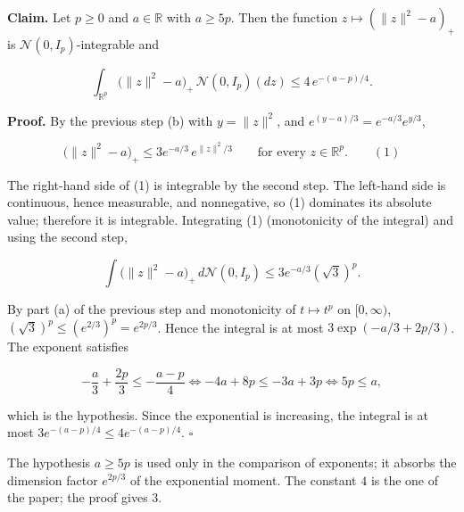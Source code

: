 \documentclass[11pt,a4paper]{article}
\begin{document}
\textbf{Claim.} Let \(p\ge0\) and \(a\in\mathbb R\) with \(a\ge5p\). Then the function \(z\mapsto(\|z\|^2-a)_+\) is \(\mathcal N(0,I_p)\)-integrable and


\[\int_{\mathbb R^p}\bigl(\|z\|^2-a\bigr)_+\,\mathcal N(0,I_p)(dz)\le4\,e^{-(a-p)/4}.\]


\textbf{Proof.} By the previous step (b) with \(y=\|z\|^2\), and \(e^{(y-a)/3}=e^{-a/3}e^{y/3}\),


\[\bigl(\|z\|^2-a\bigr)_+\le3e^{-a/3}\,e^{\|z\|^2/3}\qquad\text{for every }z\in\mathbb R^p.\qquad(1)\]


The right-hand side of (1) is integrable by the second step. The left-hand side is continuous, hence measurable, and nonnegative, so (1) dominates its absolute value; therefore it is integrable. Integrating (1) (monotonicity of the integral) and using the second step,


\[\int\bigl(\|z\|^2-a\bigr)_+\,d\mathcal N(0,I_p)\le3e^{-a/3}(\sqrt3)^p.\]


By part (a) of the previous step and monotonicity of \(t\mapsto t^p\) on \([0,\infty)\), \((\sqrt3)^p\le(e^{2/3})^p=e^{2p/3}\). Hence the integral is at most \(3\exp(-a/3+2p/3)\). The exponent satisfies


\[-\frac a3+\frac{2p}{3}\le-\frac{a-p}{4}\iff-4a+8p\le-3a+3p\iff5p\le a,\]


which is the hypothesis. Since the exponential is increasing, the integral is at most \(3e^{-(a-p)/4}\le4e^{-(a-p)/4}\). \(\square\)




The hypothesis \(a\ge5p\) is used only in the comparison of exponents; it absorbs the dimension factor \(e^{2p/3}\) of the exponential moment. The constant \(4\) is the one of the paper; the proof gives \(3\).
\end{document}
